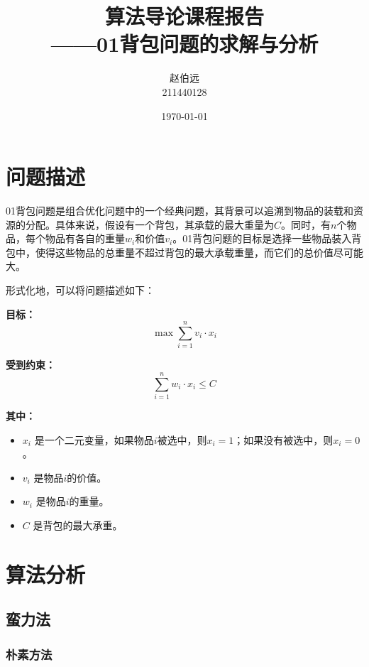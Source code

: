 \documentclass[UTF8,titlepage]{ctexart}
\numberwithin{figure}{section}
\begin{document}
\title{算法导论课程报告 \\ \large{——01背包问题的求解与分析}}
\author{赵伯远 \\ 211440128}
\date{\today}
\maketitle
\tableofcontents
\clearpage

\section{问题描述}

01背包问题是组合优化问题中的一个经典问题，其背景可以追溯到物品的装载和资源的分配。具体来说，假设有一个背包，其承载的最大重量为\( C \)。同时，有\( n \)个物品，每个物品有各自的重量\( w_i \)和价值\( v_i \)。01背包问题的目标是选择一些物品装入背包中，使得这些物品的总重量不超过背包的最大承载重量，而它们的总价值尽可能大。

形式化地，可以将问题描述如下：

\textbf{目标：}
\begin{equation}
    \max \sum_{i=1}^{n} v_i \cdot x_i
\end{equation}

\textbf{受到约束：}
\begin{equation}
    \sum_{i=1}^{n} w_i \cdot x_i \leq C
\end{equation}

\textbf{其中：}
\begin{itemize}
    \item \( x_i \) 是一个二元变量，如果物品\( i \)被选中，则\( x_i = 1 \)；如果没有被选中，则\( x_i = 0 \)。
    \item \( v_i \) 是物品\( i \)的价值。
    \item \( w_i \) 是物品\( i \)的重量。
    \item \( C \) 是背包的最大承重。
\end{itemize}

\section{算法分析}

\subsection{蛮力法}

\subsubsection{朴素方法}
\end{document}
